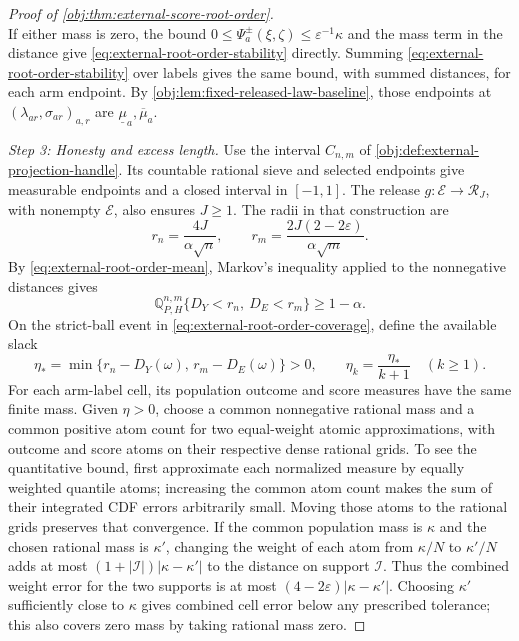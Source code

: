 \begin{proof}[Proof of \cref{obj:thm:external-score-root-order}]
\[\]
If either mass is zero, the bound \(0\leq\Psi_a^\pm(\xi,\zeta)\leq\varepsilon^{-1}\kappa\) and the mass term in the distance give \cref{eq:external-root-order-stability} directly. Summing \cref{eq:external-root-order-stability} over labels gives the same bound, with summed distances, for each arm endpoint. By \cref{obj:lem:fixed-released-law-baseline}, those endpoints at \((\lambda_{ar},\sigma_{ar})_{a,r}\) are \(\underline\mu_a,\overline\mu_a\). %

\emph{Step 3: Honesty and excess length.}
Use the interval \(C_{n,m}\) of \cref{obj:def:external-projection-handle}. Its countable rational sieve and selected endpoints give measurable endpoints and a closed interval in \([-1,1]\). The release \(g:\mathcal E\to\mathcal R_J\), with nonempty \(\mathcal E\), also ensures \(J\geq1\). The radii in that construction are
\[
r_n=\frac{4J}{\alpha\sqrt n},
\qquad
r_m=\frac{2J(2-2\varepsilon)}{\alpha\sqrt m}.
\]
By \cref{eq:external-root-order-mean}, Markov's inequality applied to the nonnegative distances gives
\[
\mathbb Q_{P,H}^{n,m}\{D_Y<r_n,\ D_E<r_m\}\geq1-\alpha. \label{eq:external-root-order-coverage}
\]
On the strict-ball event in \cref{eq:external-root-order-coverage}, define the available slack
\[
\eta_* = \min\{r_n-D_Y(\omega),\,r_m-D_E(\omega)\}>0,
\qquad \eta_k=\frac{\eta_*}{k+1}\quad(k\geq1).
\]
For each arm-label cell, its population outcome and score measures have the same finite mass. Given \(\eta>0\), choose a common nonnegative rational mass and a common positive atom count for two equal-weight atomic approximations, with outcome and score atoms on their respective dense rational grids. To see the quantitative bound, first approximate each normalized measure by equally weighted quantile atoms; increasing the common atom count makes the sum of their integrated CDF errors arbitrarily small. Moving those atoms to the rational grids preserves that convergence. If the common population mass is \(\kappa\) and the chosen rational mass is \(\kappa'\), changing the weight of each atom from \(\kappa/N\) to \(\kappa'/N\) adds at most \((1+|\mathcal I|)|\kappa-\kappa'|\) to the distance on support \(\mathcal I\). Thus the combined weight error for the two supports is at most \((4-2\varepsilon)|\kappa-\kappa'|\). Choosing \(\kappa'\) sufficiently close to \(\kappa\) gives combined cell error below any prescribed tolerance; this also covers zero mass by taking rational mass zero.


\end{proof}
